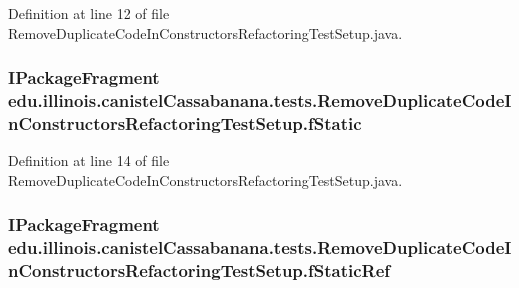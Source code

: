 Definition at line 12 of file RemoveDuplicateCodeInConstructorsRefactoringTestSetup.java.

\hypertarget{classedu_1_1illinois_1_1canistelCassabanana_1_1tests_1_1RemoveDuplicateCodeInConstructorsRefactoringTestSetup_a46435fa8daac96d40f1be8e638df6d4e}{
\subsubsection[{fStatic}]{\setlength{\rightskip}{0pt plus 5cm}IPackageFragment {\bf edu.illinois.canistelCassabanana.tests.RemoveDuplicateCodeInConstructorsRefactoringTestSetup.fStatic}}}
\label{classedu_1_1illinois_1_1canistelCassabanana_1_1tests_1_1RemoveDuplicateCodeInConstructorsRefactoringTestSetup_a46435fa8daac96d40f1be8e638df6d4e}


Definition at line 14 of file RemoveDuplicateCodeInConstructorsRefactoringTestSetup.java.

\hypertarget{classedu_1_1illinois_1_1canistelCassabanana_1_1tests_1_1RemoveDuplicateCodeInConstructorsRefactoringTestSetup_ac1eec28ae69c00995fd82d6182c27ab9}{
\subsubsection[{fStaticRef}]{\setlength{\rightskip}{0pt plus 5cm}IPackageFragment {\bf edu.illinois.canistelCassabanana.tests.RemoveDuplicateCodeInConstructorsRefactoringTestSetup.fStaticRef}}}
\label{classedu_1_1illinois_1_1canistelCassabanana_1_1tests_1_1RemoveDuplicateCodeInConstructorsRefactoringTestSetup_ac1eec28ae69c00995fd82d6182c27ab9}


